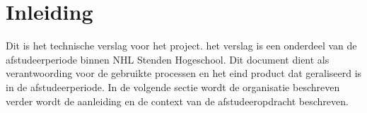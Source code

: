 \chapter{Inleiding}
Dit is het technische verslag voor het  project.
het verslag is een onderdeel van de afstudeerperiode binnen NHL Stenden Hogeschool.
Dit document dient als verantwoording voor de gebruikte processen en het eind product dat geraliseerd is in de afstudeerperiode.
In de volgende sectie wordt de organisatie beschreven verder wordt de aanleiding en de context van de afstudeeropdracht beschreven.


 

\newpage


